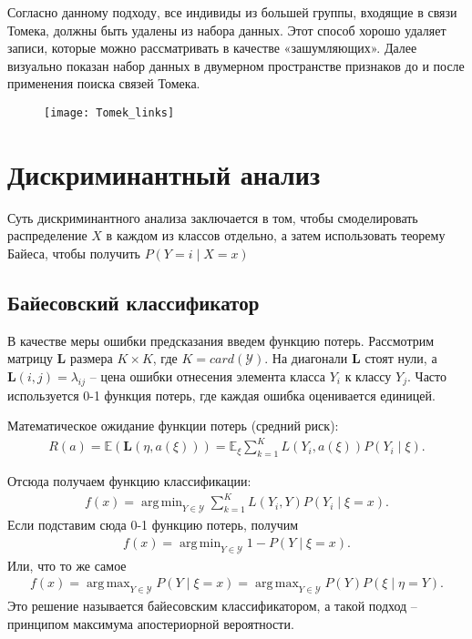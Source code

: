 \documentclass{article}
\DeclareMathOperator*{\argmin}{arg\,min}
\DeclareMathOperator*{\argmax}{arg\,max}
\begin{document}
	Согласно данному подходу, все индивиды из большей группы, входящие в связи Томека, должны быть удалены из набора данных. Этот способ хорошо удаляет записи, которые можно рассматривать в качестве «зашумляющих». Далее
	визуально показан набор данных в двумерном пространстве признаков до и после применения поиска связей Томека.
	
	\begin{figure}[hhh!]
		\begin{center}
			\texttt{[image: Tomek\_links]}
		\end{center}
		\vspace{-5mm}
	\end{figure}
	
	\section{Дискриминантный анализ}
	
	Суть дискриминантного анализа заключается в том, чтобы смоделировать распределение $X$ в каждом из классов отдельно, а затем использовать теорему Байеса, чтобы получить $P(Y = i \mid X = x)$ 
	
	\subsection{Байесовский классификатор}
	
	В качестве меры ошибки предсказания введем функцию потерь. Рассмотрим матрицу $\mathbf{L}$ размера $K \times K$, где $K = card(\mathcal{Y})$. На диагонали $\mathbf{L}$ стоят нули, а $\mathbf{L}(i,j) = \lambda_{ij}$ -- цена ошибки отнесения элемента класса $Y_i$ к классу $Y_j$. Часто используется 0-1 функция потерь, где каждая ошибка оценивается единицей.
	
	Математическое ожидание функции потерь (средний риск):
	\begin{align*}
		R(a) = \mathds{E}(\mathbf{L}(\eta, a(\xi))) = \mathds{E}_{\xi} \sum_{k = 1}^{K} L(Y_i, a(\xi)) P(Y_i \mid \xi).
	\end{align*}
	
	Отсюда получаем функцию классификации:
	\begin{align*}
		f(x) = \argmin_{Y \in \mathcal{Y}} \sum_{k = 1}^{K} L(Y_i, Y) P(Y_i \mid  \xi = x).
	\end{align*}
	Если подставим сюда 0-1 функцию потерь, получим
	\begin{align*}
		f(x) = \argmin_{Y \in \mathcal{Y}} 1 - P(Y \mid \xi = x).
	\end{align*}
	Или, что то же самое
	\begin{align*}
		f(x) = \argmax_{Y \in \mathcal{Y}} P(Y \mid \xi = x) = \argmax_{Y \in \mathcal{Y}} P(Y)P(\xi \mid \eta = Y).
	\end{align*}
	Это решение называется байесовским классификатором, а такой подход -- принципом максимума апостериорной вероятности.
	
\end{document}
